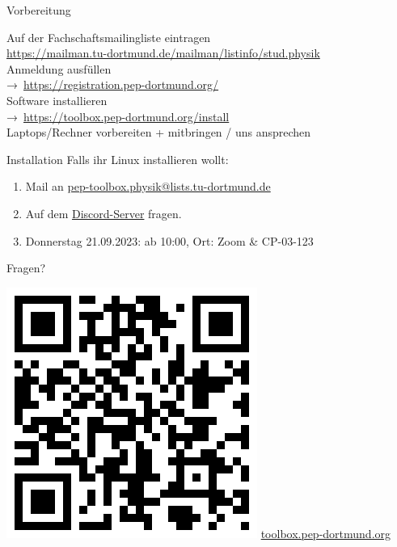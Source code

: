 \begin{frame}{Vorbereitung}
  \begin{center}
    \huge
    Auf der Fachschaftsmailingliste eintragen \\
    \url{https://mailman.tu-dortmund.de/mailman/listinfo/stud.physik}\\[0.5\baselineskip]
    Anmeldung ausfüllen\\
    →~\textcolor{blue!70!black}{\url{https://registration.pep-dortmund.org/}}\\[0.5\baselineskip]
    Software installieren\\
    →~\textcolor{blue!70!black}{\url{https://toolbox.pep-dortmund.org/install}}\\[0.5\baselineskip]
    Laptops/Rechner vorbereiten + mitbringen / uns ansprechen
  \end{center}
\end{frame}
\begin{frame}{Installation}
  \huge
  Falls ihr Linux installieren wollt:\\[0.5\baselineskip]
  \begin{enumerate}
    \item Mail an \href{mailto:pep-toolbox.physik@lists.tu-dortmund.de}{pep-toolbox.physik@lists.tu-dortmund.de}
    \item Auf dem \href{https://discord.gg/Uyyscufy7r}{Discord-Server} fragen.
    \item Donnerstag 21.09.2023: ab 10:00, Ort: Zoom \& CP-03-123
  \end{enumerate}
\end{frame}
\begin{frame}
  \begin{minipage}{.5\textwidth}
    \Huge\centering
    \textcolor{red!70!black}{Fragen?}
  \end{minipage}
  \begin{minipage}{.49\textwidth}
    \centering
    \includegraphics[width=.8\textwidth]{../qrcode/toolbox_qrcode.png}
    \Large
    \url{toolbox.pep-dortmund.org}
  \end{minipage}
\end{frame}

